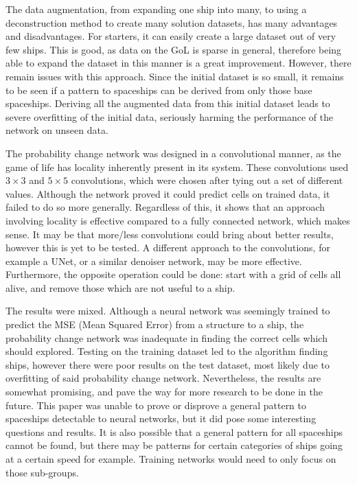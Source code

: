 \documentclass{l4proj}
\begin{document}
The data augmentation, from expanding one ship into many, to using a deconstruction method to create many solution datasets, has many advantages and disadvantages. For starters, it can easily create a large dataset out of very few ships. This is good, as data on the GoL is sparse in general, therefore being able to expand the dataset in this manner is a great improvement. However, there remain issues with this approach. Since the initial dataset is so small, it remains to be seen if a pattern to spaceships can be derived from only those base spaceships. Deriving all the augmented data from this initial dataset leads to severe overfitting of the initial data, seriously harming the performance of the network on unseen data.

The probability change network was designed in a convolutional manner, as the game of life has locality inherently present in its system. These convolutions used $3 \times 3$ and $5 \times 5$ convolutions, which were chosen after tying out a set of different values. Although the network proved it could predict cells on trained data, it failed to do so more generally. Regardless of this, it shows that an approach involving locality is effective compared to a fully connected network, which makes sense. It may be that more/less convolutions could bring about better results, however this is yet to be tested. A different approach to the convolutions, for example a UNet, or a similar denoiser network, may be more effective. Furthermore, the opposite operation could be done: start with a grid of cells all alive, and remove those which are not useful to a ship.

The results were mixed. Although a neural network was seemingly trained to predict the MSE (Mean Squared Error) from a structure to a ship, the probability change network was inadequate in finding the correct cells which should explored. Testing on the training dataset led to the algorithm finding ships, however there were poor results on the test dataset, most likely due to overfitting of said probability change network. Nevertheless, the results are somewhat promising, and pave the way for more research to be done in the future. This paper was unable to prove or disprove a general pattern to spaceships detectable to neural networks, but it did pose some interesting questions and results. It is also possible that a general pattern for all spaceships cannot be found, but there may be patterns for certain categories of ships going at a certain speed for example. Training networks would need to only focus on those sub-groups.
\end{document}
